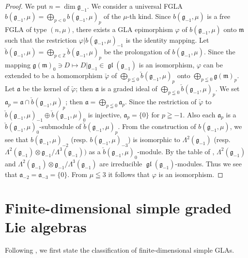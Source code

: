 \documentclass[pdftex]{sigma}
\numberwithin{equation}{section}
\numberwithin{theorem}{section}
\numberwithin{proposition}{section}
\numberwithin{lemma}{section}
\numberwithin{corollary}{section}
\numberwithin{definition}{section}
\numberwithin{example}{section}
\numberwithin{remark}{section}
\numberwithin{note}{section}
\newcommand{\gl}{\operatorname{\mathfrak{gl}}}
\begin{document}
\begin{proof}
We put $n=\dim \mathfrak g_{-1}$. We consider a universal FGLA
$b(\mathfrak g_{-1},\mu)=\bigoplus\limits_{p<0}b(\mathfrak g_{-1},\mu)_p$ of
the $\mu$-th kind. Since $b(\mathfrak g_{-1},\mu)$
is a free FGLA of type $(n,\mu)$,
there exists a GLA epimorphism $\varphi$
of $b(\mathfrak g_{-1},\mu)$ onto $\mathfrak m$ such that the restriction
$\varphi|b(\mathfrak g_{-1},\mu)_{-1}$ is the identity mapping.
Let $\check{b}(\mathfrak g_{-1},\mu)
=\bigoplus\limits_{p\in\mathbb Z}\check{b}(\mathfrak g_{-1},\mu)_p$
be the prolongation of $b(\mathfrak g_{-1},\mu)$.
Since the mapping $\mathfrak g(\mathfrak m)_0\ni D\mapsto
D|\mathfrak g_{-1}\in\gl(\mathfrak g_{-1})$ is an isomorphism,
$\varphi$ can be extended to be a homomorphism $\check{\varphi}$
of $\bigoplus\limits_{p\leqq0}\check{b}(\mathfrak g_{-1},\mu)_p$ onto
$\bigoplus\limits_{p\leqq0}\mathfrak g(\mathfrak m)_p$.
Let $\mathfrak a$ be the kernel of $\check{\varphi}$;
then $\mathfrak a$ is a graded ideal of $\bigoplus\limits_{p\leqq0}\check{b}(\mathfrak g_{-1},\mu)_p$. We set $\mathfrak a_p
=\mathfrak a\cap \check{b}(\mathfrak g_{-1},\mu)_p$; then
$\mathfrak a=\bigoplus\limits_{p\leqq 0}\mathfrak a_p$.
Since the restriction of $\check{\varphi}$ to $\check{b}(\mathfrak g_{-1},\mu)_{-1}
\oplus \check{b}(\mathfrak g_{-1},\mu)_0$ is injective,
$\mathfrak a_p=\{0\}$ for $p\geqq-1$. Also
each $\mathfrak a_p$ is a $\check{b}(\mathfrak g_{-1},\mu)_0$-submodule of
$\check{b}(\mathfrak g_{-1},\mu)_p$.
From the construction of $b(\mathfrak g_{-1},\mu)$, we see that
$b(\mathfrak g_{-1},\mu)_{-2}$ (resp. $b(\mathfrak g_{-1},\mu)_{-3}$) is
isomorphic to
$\Lambda^2(\mathfrak g_{-1})$
(resp.\ $\Lambda^2(\mathfrak g_{-1})\otimes \mathfrak g_{-1}/
\Lambda^3(\mathfrak g_{-1}))$ as a $\check{b}(\mathfrak g_{-1},\mu)_0$-module.
By the table of \cite{ov90:1},
$\Lambda^2(\mathfrak g_{-1})$ and $\Lambda^2(\mathfrak g_{-1})\otimes
\mathfrak g_{-1}/\Lambda^3(\mathfrak g_{-1})$ are irreducible
$\gl(\mathfrak g_{-1})$-modules.
Thus we see that $\mathfrak a_{-2}=\mathfrak a_{-3}=\{0\}$.
From $\mu\leqq3$ it follows that $\varphi$ is an isomorphism.
\end{proof}


\section{Finite-dimensional simple graded Lie algebras}\label{section5}

Following \cite{yam93:1}, we f\/irst state the classif\/ication of
f\/inite-dimensional simple GLAs.
\end{document}
